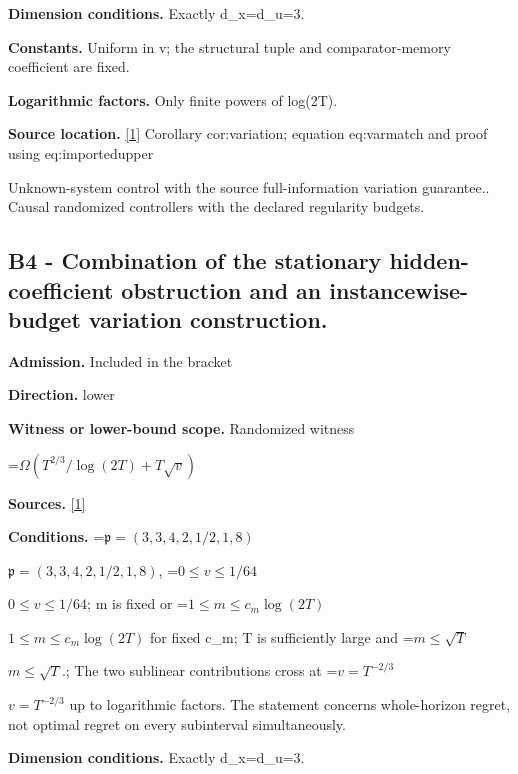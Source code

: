 \documentclass[10pt,a4paper]{article}
\newcommand{\AtlasMath}[1]{\par\begingroup\centering\setbox0=\hbox{$\displaystyle #1$}\ifdim\wd0>1.4\linewidth\typeout{ATLAS WIDE FORMULA: \the\wd0}\fi\ifdim\wd0>\linewidth\resizebox{\linewidth}{!}{\box0}\else\box0\fi\par\endgroup}
\newcommand{\AtlasInlineMath}[1]{\begingroup\setbox0=\hbox{$#1$}\ifdim\wd0>.4\linewidth\endgroup\AtlasMath{#1}\else\endgroup$#1$\fi}
\begin{document}
\textbf{Dimension conditions.} Exactly d\_x=d\_u=3.



\textbf{Constants.} Uniform in v; the structural tuple and comparator-memory coefficient are fixed.



\textbf{Logarithmic factors.} Only finite powers of log(2T).



\textbf{Source location.} \href{https://github.com/WU-Wendao/Colombo/blob/main/colombo_sensorium/Complexity_altas/data/sources/colombo/Q6/manuscript.pdf}{[1]} Corollary cor:variation; equation eq:varmatch and proof using eq:importedupper



Unknown-system control with the source full-information variation guarantee.. Causal randomized controllers with the declared regularity budgets.



\subsection{B4 - Combination of the stationary hidden-coefficient obstruction and an instancewise-budget variation construction.}


\textbf{Admission.} Included in the bracket



\textbf{Direction.} lower



\textbf{Witness or lower-bound scope.} Randomized witness



\AtlasMath{\Omega(T^{2/3}/\log(2T)+T\sqrt v)}


\textbf{Sources.} \href{https://github.com/WU-Wendao/Colombo/blob/main/colombo_sensorium/Complexity_altas/data/sources/colombo/Q6/manuscript.pdf}{[1]}



\textbf{Conditions.} \AtlasInlineMath{\mathfrak p=(3,3,4,2,1/2,1,8)}, \AtlasInlineMath{0\le v\le1/64}; m is fixed or \AtlasInlineMath{1\le m\le c_m\log(2T)} for fixed c\_m; T is sufficiently large and \AtlasInlineMath{m\le\sqrt T}.; The two sublinear contributions cross at \AtlasInlineMath{v=T^{-2/3}} up to logarithmic factors. The statement concerns whole-horizon regret, not optimal regret on every subinterval simultaneously.



\textbf{Dimension conditions.} Exactly d\_x=d\_u=3.
\end{document}
